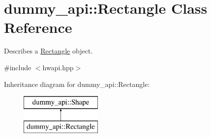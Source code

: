 \hypertarget{classdummy__api_1_1Rectangle}{}\section{dummy\+\_\+api\+:\+:Rectangle Class Reference}
\label{classdummy__api_1_1Rectangle}


Describes a \mbox{\hyperlink{classdummy__api_1_1Rectangle}{Rectangle}} object.  




{\ttfamily \#include $<$hwapi.\+hpp$>$}

Inheritance diagram for dummy\+\_\+api\+:\+:Rectangle\+:\begin{figure}[H]
\begin{center}
\leavevmode
\includegraphics[height=2.000000cm]{classdummy__api_1_1Rectangle}
\end{center}
\end{figure}
